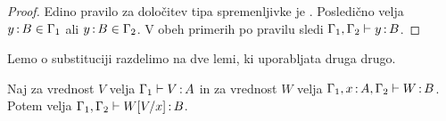 \begin{proof}
	Edino pravilo za določitev tipa spremenljivke je . Posledično velja $y \mathinner{:} B \in \Gamma_1$ ali $y \mathinner{:} B \in \Gamma_2$. V obeh primerih po pravilu  sledi $\Gamma_1, \Gamma_2 \vdash y \mathinner{:} B$.
\end{proof}

Lemo o substituciji razdelimo na dve lemi, ki uporabljata druga drugo.

\begin{lema}\label{lem:substitucija-vrednosti}
	Naj za vrednost $V$ velja $\Gamma_1 \vdash V \mathinner{:} A$ in za vrednost $W$ velja $\Gamma_1, x \mathinner{:} A, \Gamma_2 \vdash W \mathinner{:} B$. Potem velja $\Gamma_1, \Gamma_2 \vdash W[V/x] \mathinner{:} B$.
\end{lema}

